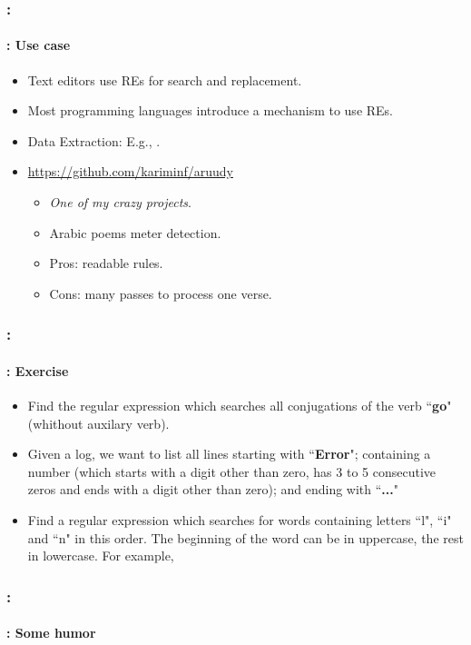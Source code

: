 \documentclass[xcolor=table]{beamer}
\begin{document}
\begin{frame}
	\frametitle{\insertshortsubtitle: \insertsection}
	\framesubtitle{\insertsubsection: Use case}

	\begin{itemize}
		\item Text editors use REs for search and replacement.
		\item Most programming languages introduce a mechanism to use REs.
		\item Data Extraction: E.g., .
		\item \url{https://github.com/kariminf/aruudy}
		\begin{itemize}
			\item \textit{One of my crazy projects}.
			\item Arabic poems meter detection.
			\item Pros: readable rules.
			\item Cons: many passes to process one verse.
		\end{itemize}
	\end{itemize}

\end{frame}


\begin{frame}
	\frametitle{\insertshortsubtitle: \insertsection}
	\framesubtitle{\insertsubsection: Exercise}
	
	\begin{itemize}
		\item Find the regular expression which searches all conjugations of the verb ``\textbf{go}" (whithout auxilary verb). 
		\item Given a log, we want to list all lines starting with ``\textbf{Error}"; containing a number (which starts with a digit other than zero, has 3 to 5 consecutive zeros and ends with a digit other than zero); and ending with ``\textbf{...}"
		\item Find a regular expression which searches for words containing letters ``l", ``i" and ``n" in this order. The beginning of the word can be in uppercase, the rest in lowercase. For example, 
	\end{itemize}
	
\end{frame}

\begin{frame}
	\frametitle{\insertshortsubtitle: \insertsection}
	\framesubtitle{\insertsubsection: Some humor}

	\begin{center}
	\end{center}

\end{frame}
\end{document}
